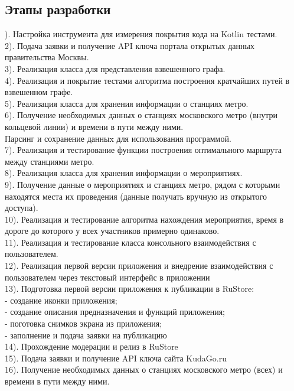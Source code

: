 \documentclass[a4paper,12pt]{extarticle}
\begin{document}
\subsection{Этапы разработки} 
). Настройка инструмента для измерения покрытия кода на Kotlin тестами.
\\
2). Подача заявки и получение API ключа портала открытых данных  правительства Москвы.
\\
3). Реализация класса для представления взвешенного графа.
\\
4). Реализация и покрытие тестами алгоритма построения 
кратчайших путей в взвешенном графе.
\\
5). Реализация класса для хранения информации о станциях метро.
\\
6). Получение необходимых данных о станциях московского метро (внутри кольцевой линии) и времени в пути между ними.
\\
Парсинг и сохранение данныx для использования программой.
\\
7). Реализация и тестирование функции построения оптимального маршрута между станциями метро.
\\
8). Реализация класса для хранения информации о мероприятиях.
\\
9). Получение данные о мероприятиях и станциях метро, рядом с которыми находятся места их проведения (данные получать вручную из открытого доступа).
\\
10). Реализация и тестирование алгоритма нахождения мероприятия, время в дороге до которого у всех участников примерно одинаково.
\\
11). Реализация и тестирование класса консольного взаимодействия с пользователем.
\\
12). Реализация первой версии приложения и внедрение взаимодействия с пользователем через текстовый интерфейс в приложении
\\
13). Подготовка первой версии приложения к публикации в RuStore:
\\
- создание иконки приложения;
\\
- создание описания предназначения и функций приложения;
\\
- поготовка снимков экрана из приложения;
\\
- заполнение и подача заявки на публикацию
\\
14). Прохождение модерации и релиз в RuStore
\\
15). Подача заявки и получение API ключа сайта KudaGo.ru
\\
16). Получение необходимых данных о станциях московского метро (всех) и времени в пути между ними.
\end{document}
